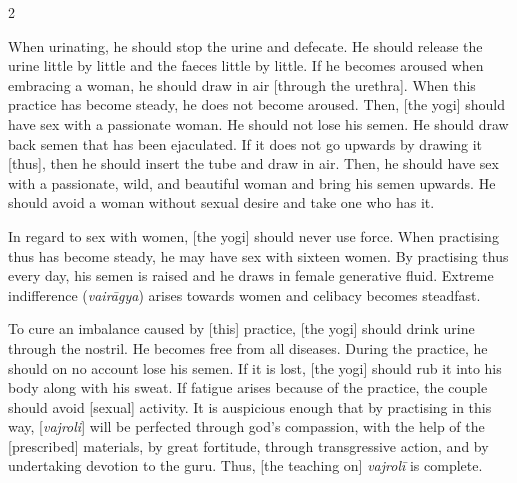 \begin{nohyp}
\begin{multicols}{2}
\begin{eng}
When urinating, he should stop the urine and defecate. He should release the urine little by little and the faeces little by little. If he becomes aroused when embracing a woman, he should draw in air [through the urethra]. When this practice has become steady, he does not become aroused. Then, [the yogi] should have sex with a passionate woman. He should not lose his semen. He should draw back semen that has been ejaculated. If it does not go upwards by drawing it [thus], then he should insert the tube and draw in air. Then, he should have sex with a passionate, wild, and beautiful woman and bring his semen upwards. He should avoid a woman without sexual desire and take one who has it.

In regard to sex with women, [the yogi] should never use force. When practising thus has become steady, he may have sex with sixteen women. By practising thus every day, his semen is raised and he draws in female generative fluid. Extreme indifference (\textit{vairāgya}) arises towards women and celibacy becomes steadfast.
\vskip 7pt


To cure an imbalance caused by [this] practice, [the yogi] should drink urine through the nostril. He becomes free from all diseases. During the practice, he should on no account lose his semen. If it is lost, [the yogi] should rub it into his body along with his sweat. If fatigue arises because of the practice, the couple should avoid [sexual] activity. It is auspicious enough that by practising in this way,  [\textit{vajroli}] will be perfected through god’s compassion, with the help of the [prescribed] materials, by great fortitude, through transgressive action, and by undertaking devotion to the guru. Thus, [the teaching on] \textit{vajrolī} is complete.
\vskip 7pt


\end{eng}
\end{multicols}
\end{nohyp}
